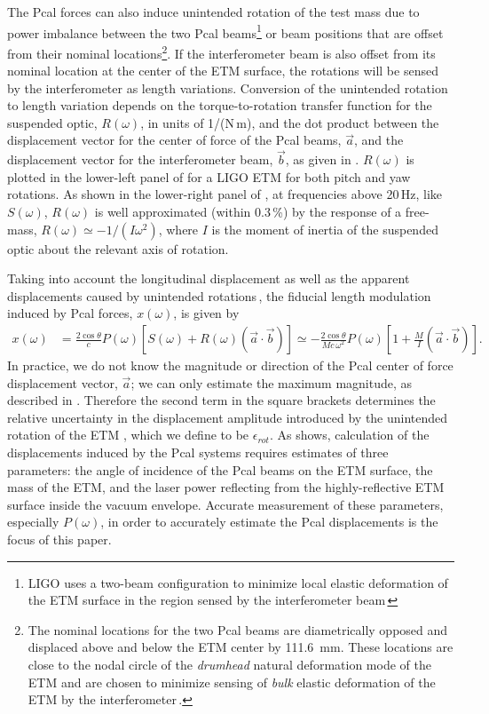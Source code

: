 \documentclass[12pt,a4paper,final]{iopart}
\begin{document}
The Pcal forces can also induce unintended rotation of the test mass due to power imbalance between the two Pcal beams\footnote{LIGO uses a two-beam configuration to minimize local elastic deformation of the ETM surface in the region sensed by the interferometer beam\,\cite{P080118,LocalDeformation}} or beam positions that are offset from their nominal locations\footnote{The nominal locations for the two Pcal beams are diametrically opposed and displaced above and below the ETM center by 111.6~mm.  These locations are close to the nodal circle of the {\em drumhead} natural deformation mode of the ETM and are chosen to minimize sensing of {\em bulk} elastic deformation of the ETM by the interferometer\,\cite{P1900127}.}. If the interferometer beam is also offset from its nominal location at the center of the ETM surface, the rotations will be sensed by the interferometer as length variations. Conversion of the unintended rotation to length variation depends on the torque-to-rotation transfer function for the suspended optic, $R(\omega)$, in units of 1/(N\,m), and the dot product between the displacement vector for the center of force of the Pcal beams, $\vec{a}$, and the displacement vector for the interferometer beam, $\vec{b}$, as given in .  $R(\omega)$ is plotted in the lower-left panel of  for a LIGO ETM for both pitch and yaw rotations.   As shown in the lower-right panel  of , at frequencies above 20\,Hz, like $S(\omega)$, $R(\omega)$ is well approximated (within 0.3\,\%) by the response of a free-mass, $R(\omega)\simeq-1/(I \omega^2)$, where $I$ is the moment of inertia of the suspended optic about the relevant axis of rotation.

Taking into account the longitudinal displacement as well as the apparent displacements caused by unintended rotations\,\cite{P080118}, the fiducial length modulation induced by Pcal forces, $x(\omega)$, is given by
%
\begin{equation}
\label{eq:pcaldisp}
\begin{split}
x(\omega) & = \frac{2 \cos\theta}{c}P(\omega)   \left[S(\omega)+ R(\omega)(\vec{a}\cdot\vec{b})\right] \simeq - \frac{2 \cos\theta}{M c \, \omega^2 }P(\omega) \left[1 + \frac{M}{I} (\vec{a}\cdot\vec{b})\right] .
\end{split}
\end{equation}
%
 In practice,  we do not know the magnitude or direction of the Pcal center of force displacement vector, $\vec{a}$; we can only estimate the maximum magnitude, as described in . Therefore the second term in the square brackets determines the relative uncertainty in the displacement amplitude introduced by the unintended rotation of the ETM , which we define to be $\epsilon_{rot}$.
 As  shows, calculation of the displacements induced by the Pcal systems requires estimates of three parameters: the angle of incidence of the Pcal beams on the ETM surface, the mass of the ETM, and the laser power reflecting from the highly-reflective ETM surface inside the vacuum envelope.  Accurate measurement of these parameters, especially $P(\omega)$, in order to accurately estimate the Pcal displacements is the focus of this paper.
 
\end{document}
